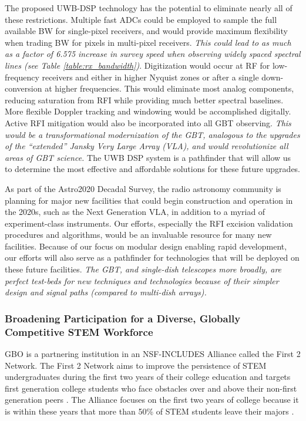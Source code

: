 \documentclass[10pt]{myNSF}
\begin{document}
The proposed UWB-DSP technology has the potential to eliminate nearly
all of these restrictions.  Multiple fast ADCs could be employed to
sample the full available BW for single-pixel receivers, and would
provide maximum flexibility when trading BW for pixels in multi-pixel
receivers.  \emph{This could lead to as much as a factor of 6.575
  increase in survey speed when observing widely spaced spectral lines
  (see Table \ref{table:rx_bandwidth})}.  Digitization would occur at
RF for low-frequency receivers and either in higher Nyquist zones or
after a single down-conversion at higher frequencies.  This would
eliminate most analog components, reducing saturation from RFI while
providing much better spectral baselines.  More flexible Doppler
tracking and windowing would be accomplished digitally.  Active RFI
mitigation would also be incorporated into all GBT observing.
\emph{This would be a transformational modernization of the GBT,
  analogous to the upgrades of the ``extended'' Jansky Very Large
  Array (VLA), and would revolutionize all areas of GBT science.}  The
UWB DSP system is a pathfinder that will allow us to determine the
most effective and affordable solutions for these future upgrades.


As part of the Astro2020 Decadal Survey, the radio astronomy community
is planning for major new facilities that could begin construction and
operation in the 2020s, such as the Next Generation VLA, in addition
to a myriad of experiment-class instruments.  Our efforts, especially
the RFI excision validation procedures and algorithms, would be an
invaluable resource for many new facilities.  Because of our focus on
modular design enabling rapid development, our efforts will also serve
as a pathfinder for technologies that will be deployed on these future
facilities.  \emph{The GBT, and single-dish telescopes more broadly,
  are perfect test-beds for new techniques and technologies because of
  their simpler design and signal paths (compared to multi-dish
  arrays).}

\subsubsection{Broadening Participation for a Diverse, Globally
  Competitive STEM Workforce}
\label{sec:workforce}
\label{sec:internship}

GBO is a partnering institution in an NSF-INCLUDES Alliance called the
First 2 Network. The First 2 Network aims to improve the persistence
of STEM undergraduates during the first two years of their college
education and targets first generation college students who face
obstacles over and above their non-first generation peers
\citep[e.g.][]{cbcs18}.  The Alliance focuses on the first two years
of college because it is within these years that more than 50\% of
STEM students leave their majors \cite{che13}.
\end{document}

